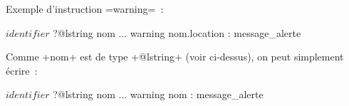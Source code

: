 Exemple d'instruction \ggsq=warning=~:

\begin{galgas4}
$identifier$ ?@lstring nom
...
warning nom.location : message_alerte
\end{galgas4}

Comme \ggsq+nom+ est de type \ggsq+@lstring+ (voir ci-dessus), on peut simplement écrire~:
\begin{galgas4}
$identifier$ ?@lstring nom
...
warning nom : message_alerte
\end{galgas4}



